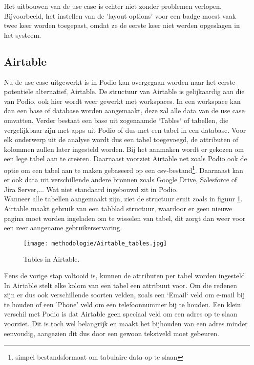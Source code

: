 Het uitbouwen van de use case is echter niet zonder problemen verlopen. Bijvoorbeeld, het instellen van de 'layout options' voor een badge moest vaak twee keer worden toegepast, omdat ze de eerste keer niet werden opgeslagen in het systeem. \\

\newpage



\subsection{Airtable} %

Nu de use case uitgewerkt is in Podio kan overgegaan worden naar het eerste potentiële alternatief, Airtable. De structuur van Airtable is gelijkaardig aan die van Podio, ook hier wordt weer gewerkt met workspaces. In een workspace kan dan een base of database worden aangemaakt, deze zal alle data van de use case omvatten. Verder bestaat een base uit zogenaamde `Tables` of tabellen, die vergelijkbaar zijn met apps uit Podio of dus met een tabel in een database. Voor elk onderwerp uit de analyse wordt dus een tabel toegevoegd, de attributen of kolommen zullen later ingesteld worden. Bij het aanmaken wordt er gekozen om een lege tabel aan te creëren. Daarnaast voorziet Airtable net zoals Podio ook de optie om een tabel aan te maken gebaseerd op een csv-bestand\footnote{simpel bestandsformaat om tabulaire data op te slaan}. Daarnaast kan er ook data uit verschillende andere bronnen zoals Google Drive, Salesforce of Jira Server,$\ldots$ Wat niet standaard ingebouwd zit in Podio. \\

Wanneer alle tabellen aangemaakt zijn, ziet de structuur eruit zoals in figuur \ref{fig:meth_airtable_tables}. Airtable maakt gebruik van een tabblad structuur, waardoor er geen nieuwe pagina moet worden ingeladen om te wisselen van tabel, dit zorgt dan weer voor een zeer aangename gebruikerservaring. \\

\begin{figure}[ht]
    \centering
    \texttt{[image: methodologie/Airtable\_tables.jpg]}
    \caption{Tables in Airtable.}
    \label{fig:meth_airtable_tables}
\end{figure}

Eens de vorige stap voltooid is, kunnen de attributen per tabel worden ingesteld. In Airtable stelt elke kolom van een tabel een attribuut voor. Om die redenen zijn er dus ook verschillende soorten velden, zoals een `Email` veld om e-mail bij te houden of een 'Phone' veld om een telefoonnummer bij te houden. Een klein verschil met Podio is dat Airtable geen speciaal veld om een adres op te slaan voorziet. Dit is toch wel belangrijk en maakt het bijhouden van een adres minder eenvoudig, aangezien dit dus door een gewoon tekstveld moet gebeuren. \\

